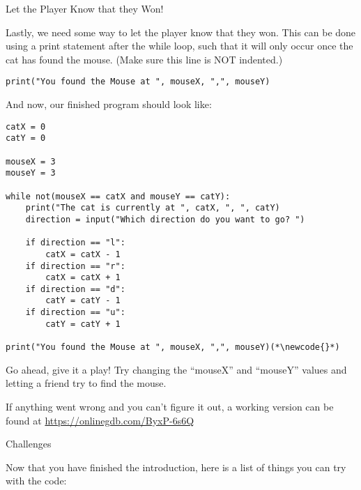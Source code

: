 \documentclass[12pt,oneside]{article}
\newcommand{\q}[1]{``#1''}
\newcommand{\subsectitle}[1]{
  \begin{flushleft}{\large#1}\end{flushleft}
}
\newcommand{\sectitle}[1]{
  \newpage
  \begin{flushleft}{\huge#1}\end{flushleft}
}
\newcommand{\newcode}[0]{\hfill<--}
\begin{document}
\begin{minipage}{\textwidth}
\subsectitle{Let the Player Know that they Won!}

Lastly, we need some way to let the player know that they won. This can be done using a print statement after the while loop, such that it will only occur once the cat has found the mouse. (Make sure this line is NOT indented.)

\begin{lstlisting}
print("You found the Mouse at ", mouseX, ",", mouseY)
\end{lstlisting}

And now, our finished program should look like:

\begin{lstlisting}
catX = 0
catY = 0

mouseX = 3
mouseY = 3

while not(mouseX == catX and mouseY == catY):
    print("The cat is currently at ", catX, ", ", catY)
    direction = input("Which direction do you want to go? ")
    
    if direction == "l":
        catX = catX - 1
    if direction == "r":
        catX = catX + 1
    if direction == "d":
        catY = catY - 1
    if direction == "u":
        catY = catY + 1

print("You found the Mouse at ", mouseX, ",", mouseY)(*\newcode{}*)
\end{lstlisting}

Go ahead, give it a play! Try changing the \q{mouseX} and \q{mouseY} values and letting a friend try to find the mouse. 

If anything went wrong and you can't figure it out, a working version can be found at \url{https://onlinegdb.com/ByxP-6s6Q}

\end{minipage}

\sectitle{Challenges}

Now that you have finished the introduction, here is a list of things you can try with the code:
\end{document}
